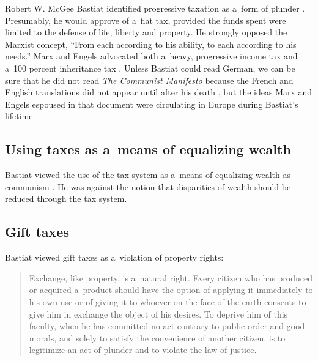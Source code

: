 \begin{artengenv}{Robert W. McGee}
Bastiat identified progressive taxation as a~form of plunder 
\parencite[][pp.18]{bastiat_foreward_1998}. %
 Presumably, he would approve of a~flat tax, provided the funds spent were limited to the defense of life, liberty and property. He strongly opposed the Marxist concept, ``From each according to his ability, to each according to his needs.'' 
\parencite[][]{marx_kritik_1875} %
 Marx and Engels advocated both a~heavy, progressive income tax and a~100 percent inheritance tax 
\parencite[][]{marx_manifest_1848}. %
 Unless Bastiat could read German, we can be sure that he did not read \textit{The Communist Manifesto} 
\parencite[][]{marx_manifest_1848} %
 because the French and English translations did not appear until after his death 
\parencite[see][]{marx_communist_2010}, %
 but the ideas Marx and Engels espoused in that document were circulating in Europe during Bastiat's lifetime.



\subsection{Using taxes as a~means of equalizing wealth}



Bastiat viewed the use of the tax system as a~means of equalizing wealth as communism 
\parencite[][p.111]{bastiat_selected_1964}. %
 He was against the notion that disparities of wealth should be reduced through the tax system.



\subsection{Gift taxes}



Bastiat viewed gift taxes as a~violation of property rights:



\begin{quote}
Exchange, like property, is a~natural right. Every citizen who has produced or acquired a~product should have the option of applying it immediately to his own use or of giving it to whoever on the face of the earth consents to give him in exchange the object of his desires. To deprive him of this faculty, when he has committed no act contrary to public order and good morals, and solely to satisfy the convenience of another citizen, is to legitimize an act of plunder and to violate the law of justice. 
\parencite[][p.112]{bastiat_selected_1964}%
\end{quote}





\end{artengenv}
